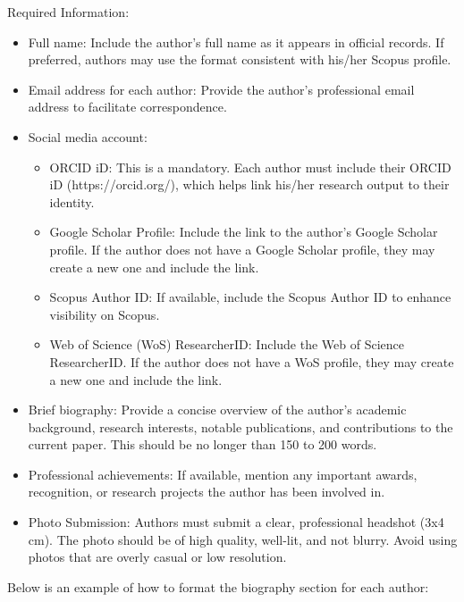 \documentclass{iaesarticle}
\begin{document}
\noindent Required Information:
\begin{itemize}[topsep=0.3ex, itemsep=0.3ex, parsep=0.2ex]
	\item[-] Full name: Include the author's full name as it appears in official records. If preferred, authors may use the format consistent with his/her Scopus profile.
	\item[-] Email address for each author: Provide the author's professional email address to facilitate correspondence.
	\item[-] Social media account:
	\begin{itemize}[topsep=0.3ex, itemsep=0.3ex, parsep=0.2ex]
		\item[$\blacksquare$] ORCID iD: This is a mandatory. Each author must include their ORCID iD (https://orcid.org/), which helps link his/her research output to their identity.
		\item[$\blacksquare$] Google Scholar Profile: Include the link to the author's Google Scholar profile. If the author does not have a Google Scholar profile, they may create a new one and include the link.
		\item[$\blacksquare$] Scopus Author ID: If available, include the Scopus Author ID to enhance visibility on Scopus.
		\item[$\blacksquare$] Web of Science (WoS) ResearcherID: Include the Web of Science ResearcherID. If the author does not have a WoS profile, they may create a new one and include the link.
	\end{itemize}
	\item[-] Brief biography: Provide a concise overview of the author's academic background, research interests, notable publications, and contributions to the current paper. This should be no longer than 150 to 200 words.
	\item[-] Professional achievements: If available, mention any important awards, recognition, or research projects the author has been involved in.
	\item[-] Photo Submission: Authors must submit a clear, professional headshot (3x4 cm). The photo should be of high quality, well-lit, and not blurry. Avoid using photos that are overly casual or low resolution.
\end{itemize}


\newpage\noindent Below is an example of how to format the biography section for each author:
\end{document}
